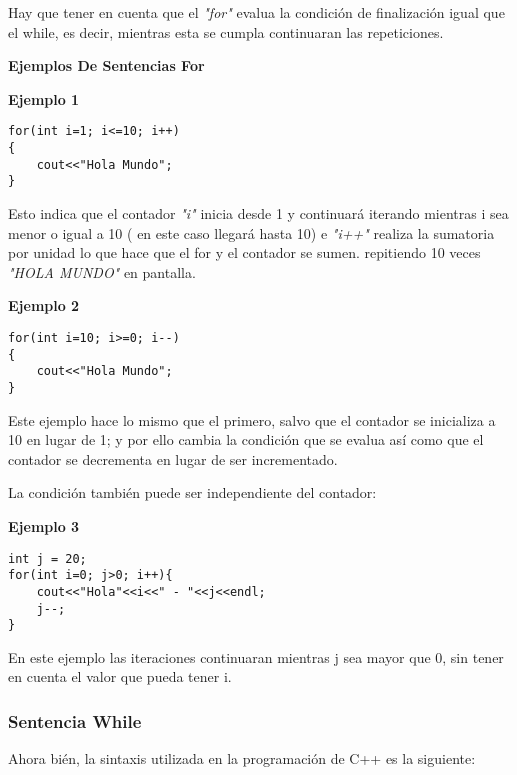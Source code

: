 Hay que tener en cuenta que el \textit{"for"} evalua la condición de finalización igual que el while, es decir, mientras esta se cumpla continuaran las repeticiones.

\begin{center}
	\textbf{Ejemplos De Sentencias For}
\end{center}

\textbf{Ejemplo 1}

\begin{lstlisting}[style=Cpp, label=for-ejemplo-1, caption=For Ejemplo 1]
for(int i=1; i<=10; i++)
{
    cout<<"Hola Mundo";   
}
\end{lstlisting}

Esto indica que el contador \textit{"i"} inicia desde 1 y continuará iterando mientras i sea menor o igual a 10 ( en este caso llegará hasta 10) e \textit{"i++"} realiza la sumatoria por unidad lo que hace que el for y el contador se sumen. repitiendo 10 veces \textit{"HOLA MUNDO"} en pantalla.

\textbf{Ejemplo 2}

\begin{lstlisting}[style=Cpp, label=for-ejemplo-2, caption=For Ejemplo 2]
for(int i=10; i>=0; i--)
{
    cout<<"Hola Mundo";   
}
\end{lstlisting}

Este ejemplo hace lo mismo que el primero, salvo que el contador se inicializa a 10 en lugar de 1; y por ello cambia la condición que se evalua así como que el contador se decrementa en lugar de ser incrementado.

La condición también puede ser independiente del contador:

\textbf{Ejemplo 3}

\begin{lstlisting}[style=Cpp, label=for-ejemplo-3, caption=For Ejemplo 3]
int j = 20;
for(int i=0; j>0; i++){
    cout<<"Hola"<<i<<" - "<<j<<endl;
    j--;
}
\end{lstlisting}

En este ejemplo las iteraciones continuaran mientras j sea mayor que 0, sin tener en cuenta el valor que pueda tener i.


\subsubsection{Sentencia While}

Ahora bién, la sintaxis utilizada en la programación de C++ es la siguiente:

